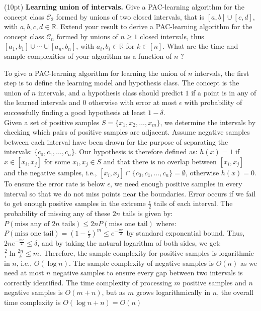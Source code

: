 \documentclass[11pt]{article}
\DeclareMathOperator{\1}{\mathbbm{1}}
\begin{document}
\begin{problem}(10pt) \textbf{Learning union of intervals.} Give a PAC-learning algorithm for the concept class $\mathcal{C}_{2}$ formed by unions of two closed intervals, that is $[a, b] \cup[c, d]$, with $a, b, c, d \in \mathbb{R}$. Extend your result to derive a PAC-learning algorithm for the concept class $\mathcal{C}_{n}$ formed by unions of $n \geq 1$ closed intervals, thus $\left[a_{1}, b_{1}\right] \cup \cdots \cup\left[a_{n}, b_{n}\right]$, with $a_{i}, b_{i} \in \mathbb{R}$ for $k \in[n]$. What are the time and sample complexities of your algorithm as a function of $n$ ?
\end{problem}
To give a PAC-learning algorithm for learning the union of \(n\) intervals, the first step is to define the learning model and hypothesis class. The concept is the union of \(n\) intervals, and a hypothesis class should predict \(1\) if a point is in any of the learned intervals and 0 otherwise with error at most \(\epsilon\) with probability of successfully finding a good hypothesis at least \(1-\delta\).\\
Given a set of positive samples \( S= \{ x_1, x_2, \ldots, x_m \} \), we determine the intervals by checking which pairs of positive samples are adjacent. Assume negative samples between each interval have been drawn for the purpose of separating the intervals: \(\{c_0, c_1, \ldots, c_n \}\). Our hypothesis is therefore defined as: \(h(x)=1\) if \(x \in [x_i, x_j]\) for some \(x_i, x_j \in S\) and that there is no overlap between \([x_i, x_j]\) and the negative samples, i.e., \([x_i, x_j] \cap \{c_0, c_1, \ldots, c_n \} = \emptyset\), otherwise \(h(x)=0\).\\
To ensure the error rate is below \(\epsilon\), we need enough positive samples in every interval so that we do not miss points near the boundaries. Error occurs if we fail to get enough positive samples in the extreme \(\frac{\epsilon}{2}\) tails of each interval. The probability of missing any of these \(2n\) tails is given by: \(P(\text{miss any of } 2n \text{ tails}) \leq 2nP(\text{miss one tail})\) where: \(P(\text{miss one tail})=(1-\frac{\epsilon}{2})^m \leq e^{-\frac{m\epsilon}{2}}\) by standard exponential bound. Thus, \(2ne^{-\frac{m\epsilon}{2}} \leq \delta\), and by taking the natural logarithm of both sides, we get: \(\frac{2}{\epsilon}\ln \frac{2n}{\delta} \leq m\). Therefore, the sample complexity for positive samples is logarithmic in \(n\), i.e., \(O(\log n)\). The sample complexity of negative samples is \(O(n)\) as we need at most \(n\) negative samples to ensure every gap between two intervals is correctly identified. The time complexity of processing \(m\) positive samples and \(n\) negative samples is \(O(m + n)\), but as \(m\) grows logarithmically in \(n\), the overall time complexity is \(O(\log n + n)=O(n)\)
\end{document}
